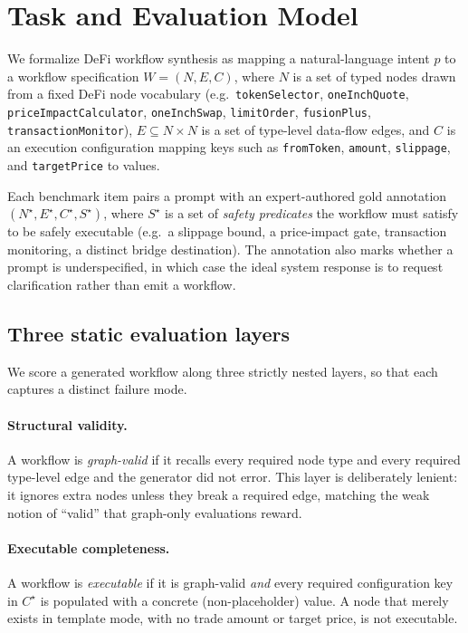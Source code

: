 \section{Task and Evaluation Model}
\label{sec:method}

We formalize DeFi workflow synthesis as mapping a natural-language intent
$p$ to a workflow specification $W = (N, E, C)$, where $N$ is a set of
typed nodes drawn from a fixed DeFi node vocabulary (e.g.\
\texttt{tokenSelector}, \texttt{oneInchQuote}, \texttt{priceImpact\-Calculator},
\texttt{oneInchSwap}, \texttt{limitOrder}, \texttt{fusionPlus},
\texttt{transactionMonitor}), $E \subseteq N \times N$ is a set of
type-level data-flow edges, and $C$ is an execution configuration mapping
keys such as \texttt{fromToken}, \texttt{amount}, \texttt{slippage}, and
\texttt{targetPrice} to values.

Each benchmark item pairs a prompt with an expert-authored gold
annotation $(N^{\star}, E^{\star}, C^{\star}, S^{\star})$, where
$S^{\star}$ is a set of \emph{safety predicates} the workflow must satisfy
to be safely executable (e.g.\ a slippage bound, a price-impact gate,
transaction monitoring, a distinct bridge destination). The annotation
also marks whether a prompt is underspecified, in which case the ideal
system response is to request clarification rather than emit a workflow.

\subsection{Three static evaluation layers}

We score a generated workflow along three strictly nested layers, so that
each captures a distinct failure mode.

\paragraph{Structural validity.} A workflow is \emph{graph-valid} if it
recalls every required node type and every required type-level edge and
the generator did not error. This layer is deliberately lenient: it
ignores extra nodes unless they break a required edge, matching the weak
notion of ``valid'' that graph-only evaluations reward.

\paragraph{Executable completeness.} A workflow is \emph{executable} if it
is graph-valid \emph{and} every required configuration key in $C^{\star}$
is populated with a concrete (non-placeholder) value. A node that merely
exists in template mode, with no trade amount or target price, is not
executable.

